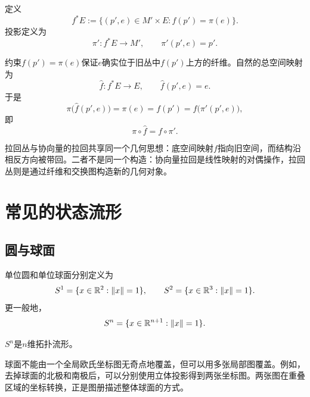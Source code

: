 \begin{definition}[拉回丛]
定义
\[
    f^*E
    :=
    \{(p',e)\in M'\times E:
      f(p')=\pi(e)\}.
\]
投影定义为
\[
    \pi':f^*E\to M',
    \qquad
    \pi'(p',e)=p'.
\]
\end{definition}

约束$f(p')=\pi(e)$保证$e$确实位于旧丛中$f(p')$上方的纤维。自然的总空间映射为
\[
    \widehat f:f^*E\to E,
    \qquad
    \widehat f(p',e)=e.
\]
于是
\[
    \pi\bigl(\widehat f(p',e)\bigr)
    =
    \pi(e)
    =
    f(p')
    =
    f\bigl(\pi'(p',e)\bigr),
\]
即
\[
    \pi\circ\widehat f=f\circ\pi'.
\]

\begin{center}
\end{center}

拉回丛与协向量的拉回共享同一个几何思想：底空间映射$f$指向旧空间，而结构沿相反方向被带回。二者不是同一个构造：协向量拉回是线性映射的对偶操作，拉回丛则是通过纤维和交换图构造新的几何对象。


\section{常见的状态流形}

\subsection{圆与球面}

\begin{definition}[单位圆与单位球面]
单位圆和单位球面分别定义为
\[
    S^1=\{x\in\mathbb{R}^2:\|x\|=1\},
    \qquad
    S^2=\{x\in\mathbb{R}^3:\|x\|=1\}.
\]
更一般地，
\[
    S^n=\{x\in\mathbb{R}^{n+1}:\|x\|=1\}.
\]
\end{definition}

\begin{theorem}[球面为流形]
$S^n$是$n$维拓扑流形。
\end{theorem}

球面不能由一个全局欧氏坐标图无奇点地覆盖，但可以用多张局部图覆盖。例如，去掉球面的北极和南极后，可以分别使用立体投影得到两张坐标图。两张图在重叠区域的坐标转换，正是图册描述整体球面的方式。

